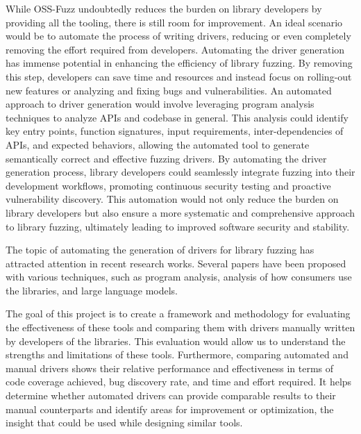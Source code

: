 \documentclass[a4paper,11pt,oneside]{report}
\begin{document}
While OSS-Fuzz undoubtedly reduces the burden on library developers
by providing all the tooling, there is still room for improvement. An ideal
scenario would be to automate the process of writing drivers, reducing or 
even completely removing the effort required from developers.
Automating the driver generation has immense potential in enhancing the
efficiency of library fuzzing. By removing this step, developers can save
time and resources and instead focus on rolling-out new features or
analyzing and fixing bugs and vulnerabilities. 
An automated approach to driver generation would involve leveraging
program analysis techniques to analyze APIs and codebase in general. This analysis could identify 
key entry points, function signatures, input requirements, inter-dependencies of APIs,
and expected behaviors, allowing the automated tool to generate semantically correct 
and effective fuzzing drivers.
By automating the driver generation process, library developers could 
seamlessly integrate fuzzing into their development workflows, promoting 
continuous security testing and proactive vulnerability discovery. 
This automation would not only reduce the burden on library developers 
but also ensure a more systematic and comprehensive approach to 
library fuzzing, ultimately leading to improved software security and stability.

The topic of automating the generation of drivers for library fuzzing
has attracted attention in recent research works. Several papers have
been proposed with various techniques, such as program analysis,
analysis of how consumers use the libraries, and large language models.

The goal of this project is to create a framework and methodology for
evaluating the effectiveness of these tools and comparing them with drivers
manually written by developers of the libraries. This evaluation would 
allow us to understand the strengths and limitations of these tools. 
Furthermore, comparing automated and manual drivers shows their relative 
performance and effectiveness in terms of code coverage achieved, 
bug discovery rate, and time and effort required. 
It helps determine whether automated drivers can provide comparable 
results to their manual counterparts and identify areas for improvement 
or optimization, the insight that could be used while designing similar tools.





\end{document}
